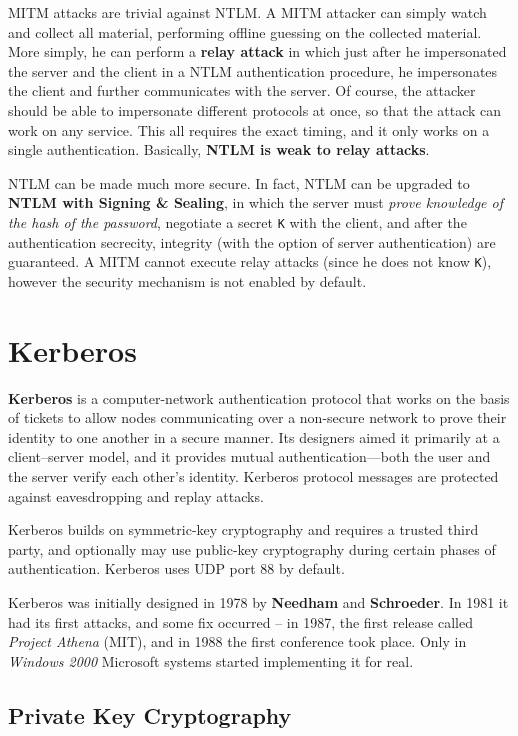 \documentclass[10pt]{extbook}
\begin{document}
MITM attacks are trivial against NTLM. A MITM attacker can simply watch and
collect all material, performing offline guessing on the collected material.
More simply, he can perform a \textbf{relay attack} in which just after he
impersonated the server and the client in a NTLM authentication procedure, he
impersonates the client and further communicates with the server. Of course,
the attacker should be able to impersonate different protocols at once, so that
the attack can work on any service. This all requires the exact timing, and it
only works on a single authentication. Basically, \textbf{NTLM is weak to relay
attacks}.

NTLM can be made much more secure. In fact, NTLM can be upgraded to
\textbf{NTLM with Signing \& Sealing}, in which the server must \emph{prove
knowledge of the hash of the password}, negotiate a secret \texttt{K} with the
client, and after the authentication secrecity, integrity (with the option of
server authentication) are guaranteed. A MITM cannot execute relay attacks
(since he does not know \texttt{K}), however the security mechanism is not
enabled by default.

\section{Kerberos}
\textbf{Kerberos} is a computer-network authentication protocol that
works on the basis of tickets to allow nodes communicating over a non-secure
network to prove their identity to one another in a secure manner. Its
designers aimed it primarily at a client–server model, and it provides mutual
authentication—both the user and the server verify each other's identity.
Kerberos protocol messages are protected against eavesdropping and replay
attacks.

Kerberos builds on symmetric-key cryptography and requires a trusted third
party, and optionally may use public-key cryptography during certain phases of
authentication. Kerberos uses UDP port 88 by default.

Kerberos was initially designed in 1978 by \textbf{Needham} and
\textbf{Schroeder}. In 1981 it had its first attacks, and some fix occurred --
in 1987, the first release called \emph{Project Athena} (MIT), and in 1988 the
first conference took place. Only in \emph{Windows 2000} Microsoft systems
started implementing it for real.


\subsection{Private Key Cryptography}
\end{document}
